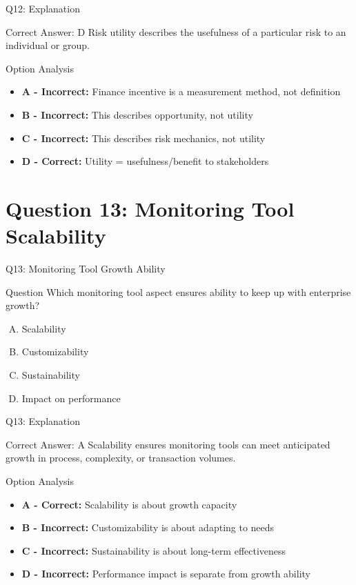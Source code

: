 \documentclass{beamer}
\begin{document}
	\begin{frame}{Q12: Explanation}
		\begin{block}{Correct Answer: D}
			Risk utility describes the usefulness of a particular risk to an individual or group.
		\end{block}
		\begin{block}{Option Analysis}
			\begin{itemize}
				\item \textbf{A - Incorrect:} Finance incentive is a measurement method, not definition
				\item \textbf{B - Incorrect:} This describes opportunity, not utility
				\item \textbf{C - Incorrect:} This describes risk mechanics, not utility
				\item \textbf{D - Correct:} Utility = usefulness/benefit to stakeholders
			\end{itemize}
		\end{block}
	\end{frame}
	
	\section{Question 13: Monitoring Tool Scalability}
	
	\begin{frame}{Q13: Monitoring Tool Growth Ability}
		\begin{block}{Question}
			Which monitoring tool aspect ensures ability to keep up with enterprise growth?
		\end{block}
		\begin{enumerate}[(A)]
			\item Scalability
			\item Customizability
			\item Sustainability
			\item Impact on performance
		\end{enumerate}
	\end{frame}
	
	\begin{frame}{Q13: Explanation}
		\begin{block}{Correct Answer: A}
			Scalability ensures monitoring tools can meet anticipated growth in process, complexity, or transaction volumes.
		\end{block}
		\begin{block}{Option Analysis}
			\begin{itemize}
				\item \textbf{A - Correct:} Scalability is about growth capacity
				\item \textbf{B - Incorrect:} Customizability is about adapting to needs
				\item \textbf{C - Incorrect:} Sustainability is about long-term effectiveness
				\item \textbf{D - Incorrect:} Performance impact is separate from growth ability
			\end{itemize}
		\end{block}
	\end{frame}
	
\end{document}
